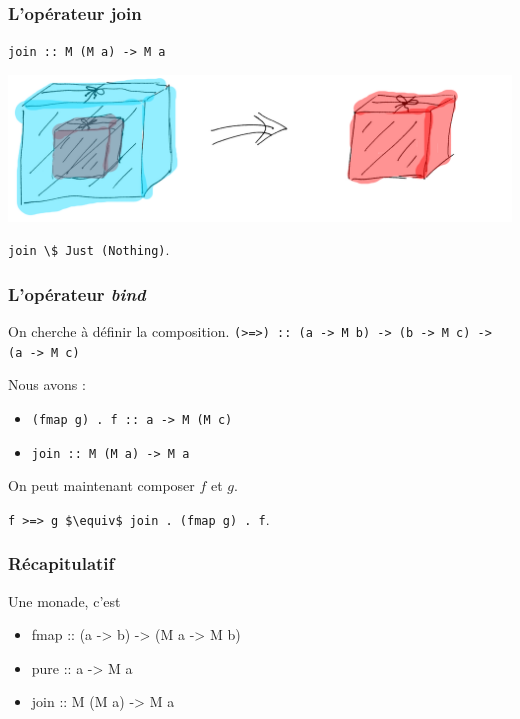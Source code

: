 \documentclass{beamer}
\begin{document}
\begin{frame}
\frametitle{L'opérateur join}
\begin{block}{}
\begin{center}
\verb!join :: M (M a) -> M a!
\end{center}
\end{block}
\medskip
\begin{center}
\includegraphics[scale=0.2]{join_nothing.png}
\end{center}
\medskip
\pause
\begin{exampleblock}{}
\begin{center}
\verb!join \$ Just (Nothing)!.
\end{center}
\end{exampleblock}
\end{frame}



\begin{frame}
\frametitle{L'opérateur \emph{bind}}
\begin{block}{On cherche à définir la composition.}
\verb!(>=>) :: (a -> M b) -> (b -> M c) -> (a -> M c)!
\end{block}

\pause

\begin{block}{Nous avons :}
\begin{itemize}
\item \verb!(fmap g) . f :: a -> M (M c)!
\item \verb!join :: M (M a) -> M a!
\end{itemize}
\end{block}
\pause

\begin{block}{On peut maintenant composer $f$ et $g$.}

\verb!f >=> g $\equiv$ join . (fmap g) . f!.
\end{block}
\end{frame}

\begin{frame}
\frametitle{Récapitulatif}

\begin{block}{Une monade, c'est}

	\begin{itemize}
		\item fmap :: (a -> b) -> (M a -> M b)
		\item pure :: a -> M a
		\item join :: M (M a) -> M a
	\end{itemize}

\end{block}

\end{frame}
\end{document}
